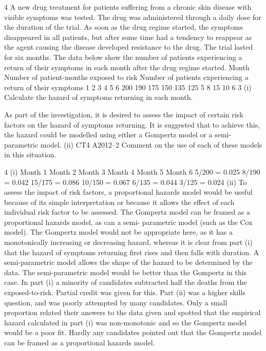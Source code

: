 \documentclass[a4paper,12pt]{article}
\begin{document}
\begin{enumerate}


4
A new drug treatment for patients suffering from a chronic skin disease with visible
symptoms was tested. The drug was administered through a daily dose for the
duration of the trial. As soon as the drug regime started, the symptoms disappeared in
all patients, but after some time had a tendency to reappear as the agent causing the
disease developed resistance to the drug. The trial lasted for six months.
The data below show the number of patients experiencing a return of their symptoms
in each month after the drug regime started.
Month Number of patient-months
exposed to risk Number of patients experiencing
a return of their symptoms
1
2
3
4
5
6 200
190
175
150
135
125 5
8
15
10
6
3
(i)
Calculate the hazard of symptoms returning in each month.

As part of the investigation, it is desired to assess the impact of certain risk factors on
the hazard of symptoms returning. It is suggested that to achieve this, the hazard
could be modelled using either a Gompertz model or a semi-parametric model.
(ii)
CT4 A2012–2
Comment on the use of each of these models in this situation.
\end{enumerate}
\newpage

\newpage

4
(i) Month 1
Month 2
Month 3
Month 4
Month 5
Month 6
5/200 = 0.025
8/190 = 0.042
15/175 = 0.086
10/150 = 0.067
6/135 = 0.044
3/125 = 0.024
(ii) To assess the impact of risk factors, a proportional hazards model would be useful
because of its simple interpretation or because it allows the effect of each individual
risk factor to be assessed.
The Gompertz model can be framed as a proportional hazards model, as can a semi-
parametric model (such as the Cox model).
The Gompertz model would not be appropriate here, as it has a monotonically
increasing or decreasing hazard,
whereas it is clear from part (i) that the hazard of symptoms returning first rises and
then falls with duration.
A semi-parametric model allows the shape of the hazard to be determined by the data.
The semi-parametric model would be better than the Gompertz in this case.
In part (i) a minority of candidates subtracted half the deaths from the exposed-to-risk. Partial credit was given for this. Part (ii) was a higher skills question, and was poorly
attempted by many candidates. Only a small proportion related their answers to the data 
given and spotted that the empirical hazard calculated in part (i) was non-monotonic and so
the Gompertz model would be a poor fit. Hardly any candidates pointed out that the
Gompertz model can be framed as a proportional hazards model.
\end{document}
